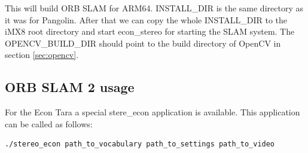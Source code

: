 \documentclass[11pt,a4paper,titlepage,oneside]{report}
\begin{document}
This will build ORB SLAM for ARM64. INSTALL\_DIR is the same directory as it was for Pangolin. After that we can copy the whole INSTALL\_DIR to the iMX8 root directory and start econ\_stereo for starting the SLAM system. The OPENCV\_BUILD\_DIR should point to the build directory of OpenCV in section \ref{sec:opencv}.

\subsection{ORB SLAM 2 usage}

For the Econ Tara a special stere\_econ application is available. This application can be called as follows:
\begin{lstlisting}[language=bash]
./stereo_econ path_to_vocabulary path_to_settings path_to_video
\end{lstlisting}
\end{document}
